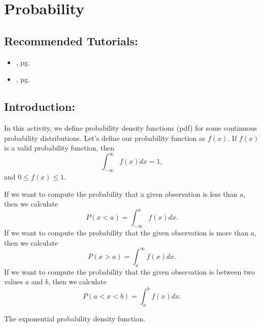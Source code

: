 \section{Probability}
\label{sec:probability}	

\subsection*{Recommended Tutorials:}
\begin{itemize}[noitemsep]
    \item {}, pg. \pageref{chp:assignment_operator}
	\item {}, pg. \pageref{chp:definite_and_indefinite_Integrals}
\end{itemize}

\subsection*{Introduction:}
In this activity, we define probability density functions (pdf) for some continuous probability distributions. Let’s define our probability function as $f(x)$. If $f(x)$ is a valid probability function, then
\[ \int_{-\infty}^{\infty} f(x)dx=1, \]
and $ 0  \leq f(x) \leq 1$. 
 
If we want to compute the probability that a given observation is less than $a$, then we calculate
\[ P(x<a)=\int_{-\infty}^{a} f(x)dx. \]
If we want to compute the probability that the given observation is more than $a$, then we calculate
\[ P(x>a)=\int_{a}^{\infty} f(x)dx. \]
If we want to compute the probability that the given observation is between two values $a$ and $b$, then we calculate 
\[ P(a<x<b)=\int_{a}^{b} f(x)dx. \]

\begin{marginfigure}[-0.5cm]
    \hspace{-4cm}
    \centering
    \caption{The exponential probability density function.}
    \label{fig:exponential_dist}
\end{marginfigure}
    
